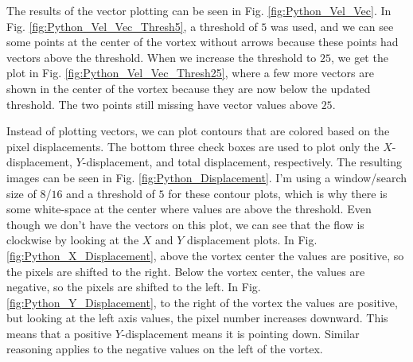 \documentclass[letterpaper,12pt]{article}
\begin{document}
The results of the vector plotting can be seen in Fig. \ref{fig:Python_Vel_Vec}.  In Fig. \ref{fig:Python_Vel_Vec_Thresh5}, a threshold of $5$ was used, and we can see some points at the center of the vortex without arrows because these points had vectors above the threshold.  When we increase the threshold to $25$, we get the plot in Fig. \ref{fig:Python_Vel_Vec_Thresh25}, where a few more vectors are shown in the center of the vortex because they are now below the updated threshold.  The two points still missing have vector values above $25$.

Instead of plotting vectors, we can plot contours that are colored based on the pixel displacements.  The bottom three check boxes are used to plot only the $X$-displacement, $Y$-displacement, and total displacement, respectively.  The resulting images can be seen in Fig. \ref{fig:Python_Displacement}.  I'm using a window/search size of $8$/$16$ and a threshold of $5$ for these contour plots, which is why there is some white-space at the center where values are above the threshold.  Even though we don't have the vectors on this plot, we can see that the flow is clockwise by looking at the $X$ and $Y$ displacement plots.  In Fig. \ref{fig:Python_X_Displacement}, above the vortex center the values are positive, so the pixels are shifted to the right.  Below the vortex center, the values are negative, so the pixels are shifted to the left.  In Fig. \ref{fig:Python_Y_Displacement}, to the right of the vortex the values are positive, but looking at the left axis values, the pixel number increases downward.  This means that a positive $Y$-displacement means it is pointing down.  Similar reasoning applies to the negative values on the left of the vortex.
\end{document}
